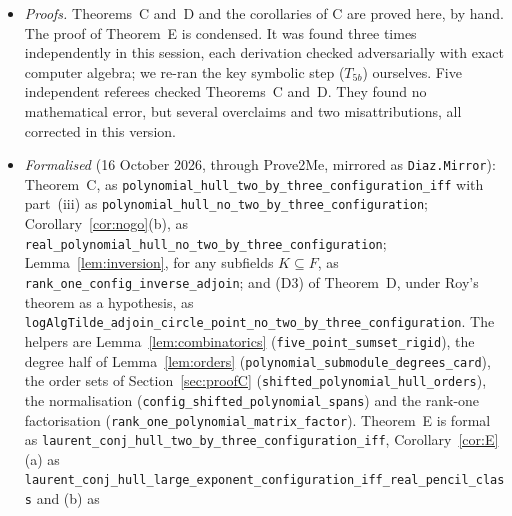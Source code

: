\documentclass[11pt,a4paper]{article}
\theoremstyle{plain}
\theoremstyle{definition}
\begin{document}
\begin{itemize}
\item \emph{Proofs.} Theorems~C and~D and the corollaries of C are proved here, by hand.
The proof of Theorem~E is condensed. It was found three times independently in this
session, each derivation checked adversarially with exact computer algebra; we re-ran
the key symbolic step ($T_{5b}$) ourselves. Five independent referees checked
Theorems~C and~D. They found no mathematical error, but several overclaims and two
misattributions, all corrected in this version.
\item \emph{Formalised} (16 October 2026, through Prove2Me, mirrored as \texttt{Diaz.Mirror}): Theorem~C, as
\texttt{polynomial\_\allowbreak{}hull\_\allowbreak{}two\_\allowbreak{}by\_\allowbreak{}three\_\allowbreak{}configuration\_\allowbreak{}iff} with part~(iii) as
\texttt{polynomial\_\allowbreak{}hull\_\allowbreak{}no\_\allowbreak{}two\_\allowbreak{}by\_\allowbreak{}three\_\allowbreak{}configuration}; Corollary~\ref{cor:nogo}(b), as
\texttt{real\_\allowbreak{}polynomial\_\allowbreak{}hull\_\allowbreak{}no\_\allowbreak{}two\_\allowbreak{}by\_\allowbreak{}three\_\allowbreak{}configuration}; Lemma~\ref{lem:inversion}, for any subfields
$K\subseteq F$, as \texttt{rank\_\allowbreak{}one\_\allowbreak{}config\_\allowbreak{}inverse\_\allowbreak{}adjoin}; and (D3) of Theorem~D, under Roy's theorem
as a hypothesis, as \texttt{logAlgTilde\_\allowbreak{}adjoin\_\allowbreak{}circle\_\allowbreak{}point\_\allowbreak{}no\_\allowbreak{}two\_\allowbreak{}by\_\allowbreak{}three\_\allowbreak{}configuration}.
The helpers are Lemma~\ref{lem:combinatorics} (\texttt{five\_\allowbreak{}point\_\allowbreak{}sumset\_\allowbreak{}rigid}), the degree half of
Lemma~\ref{lem:orders} (\texttt{polynomial\_\allowbreak{}submodule\_\allowbreak{}degrees\_\allowbreak{}card}), the order sets of Section~\ref{sec:proofC}
(\texttt{shifted\_\allowbreak{}polynomial\_\allowbreak{}hull\_\allowbreak{}orders}), the normalisation (\texttt{config\_\allowbreak{}shifted\_\allowbreak{}polynomial\_\allowbreak{}spans})
and the rank-one factorisation (\texttt{rank\_\allowbreak{}one\_\allowbreak{}polynomial\_\allowbreak{}matrix\_\allowbreak{}factor}). Theorem~E is formal as
\texttt{laurent\_\allowbreak{}conj\_\allowbreak{}hull\_\allowbreak{}two\_\allowbreak{}by\_\allowbreak{}three\_\allowbreak{}configuration\_\allowbreak{}iff}, Corollary~\ref{cor:E}(a) as
\texttt{laurent\_\allowbreak{}conj\_\allowbreak{}hull\_\allowbreak{}large\_\allowbreak{}exponent\_\allowbreak{}configuration\_\allowbreak{}iff\_\allowbreak{}real\_\allowbreak{}pencil\_\allowbreak{}class} and (b) as

\end{itemize}
\end{document}
